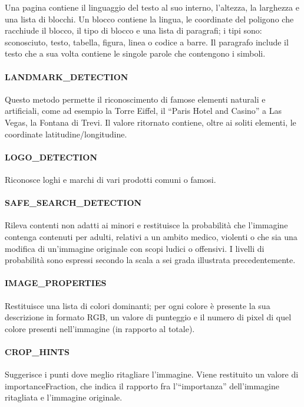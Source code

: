Una pagina contiene il linguaggio del testo al suo interno, l'altezza, la larghezza e una lista di blocchi.
Un blocco contiene la lingua, le coordinate del poligono che racchiude il blocco, il tipo di blocco e una lista di paragrafi;
i tipi sono: sconosciuto, testo, tabella, figura, linea o codice a barre.
Il paragrafo include il testo che a sua volta contiene le singole parole che contengono i simboli.
%
\paragraph{\textsf{LANDMARK\_DETECTION}} Questo metodo permette il riconoscimento di famose elementi naturali e artificiali, come ad esempio la Torre Eiffel, il ``Paris Hotel and Casino'' a Las Vegas, la Fontana di Trevi.
Il valore ritornato contiene, oltre ai soliti elementi, le coordinate latitudine/longitudine.
%
\paragraph{\textsf{LOGO\_DETECTION}} Riconosce loghi e marchi di vari prodotti comuni o famosi.
%
\paragraph{\textsf{SAFE\_SEARCH\_DETECTION}} Rileva contenti non adatti ai minori e restituisce la probabilità che l'immagine contenga
contenuti per adulti, relativi a un ambito medico, violenti o che sia una modifica di un'immagine originale con scopi ludici o offensivi.
I livelli di probabilità sono espressi secondo la scala a sei grada illustrata precedentemente.
%
\paragraph{\textsf{IMAGE\_PROPERTIES}} Restituisce una lista di colori dominanti; per ogni colore è presente la sua descrizione in formato RGB,
un valore di punteggio e il numero di pixel di quel colore presenti nell'immagine (in rapporto al totale).
%
\paragraph{\textsf{CROP\_HINTS}} Suggerisce i punti dove meglio ritagliare l'immagine.
Viene restituito un valore di \textsf{importanceFraction}, che indica il rapporto fra l'``importanza'' dell'immagine ritagliata e l'immagine originale.
%
